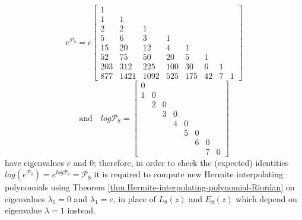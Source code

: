 \begin{example}
\begin{displaymath}
e^{\mathcal{P}_{8}} = e \left[\begin{matrix}1 &   &   &   &   &   &   &  \\1 & 1 &   &   &   &   &   &  \\2 & 2 & 1 &   &   &   &   &  \\5 & 6 & 3 & 1 &   &   &   &  \\15 & 20 & 12 & 4 & 1 &   &   &  \\52 & 75 & 50 & 20 & 5 & 1 &   &  \\203 & 312 & 225 & 100 & 30 & 6 & 1 &  \\877 & 1421 & 1092 & 525 & 175 & 42 & 7 & 1\end{matrix}\right]
\end{displaymath}
\begin{displaymath}
\text{and}\quad log{\mathcal{P}_{8}} = \left[\begin{matrix} 0 &   &   &   &   &   &   &  \\1 & 0   &   &   &   &   &   &  \\  & 2 &  0  &   &   &   &   &  \\  &   & 3 &  0  &   &   &   &  \\  &   &   & 4 &  0  &   &   &  \\  &   &   &   & 5 &  0  &   &  \\  &   &   &   &   & 6 &  0  &  \\  &   &   &   &   &   & 7 &  0 \end{matrix}\right]
\end{displaymath}
have eigenvalues $e$ and $0$; therefore, in order to check the (expected)
identities $log\left(e^{\mathcal{P}_{8}}\right) = e^{log{\mathcal{P}_{8}}} =
\mathcal{P}_{8}$ it is required to compute new Hermite interpolating
polynomials  using Theorem \ref{thm:Hermite-interpolating-polynomial-Riordan} on
eigenvalues $\lambda_{1}=0$ and $\lambda_{1}=e$, in place of $L_{8}(z)$ and
$E_{8}(z)$ which depend on eigenvalue $\lambda=1$ instead.
\end{example}

